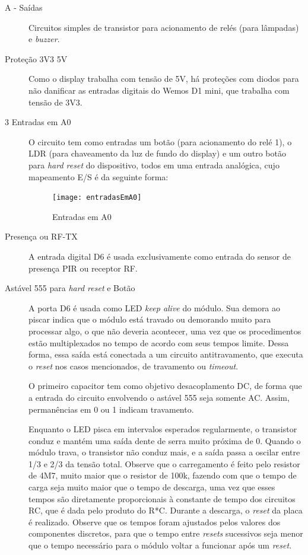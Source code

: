\begin{description}
\item [A - Saídas] Circuitos simples de transistor para acionamento de relés (para lâmpadas) e \emph{buzzer}.
\item [Proteção 3V3 5V] Como o display trabalha com tensão de 5V, há proteções com diodos para não danificar as entradas digitais do Wemos D1 mini, que trabalha com tensão de 3V3.
\item [3 Entradas em A0] O circuito tem como entradas um botão (para acionamento do relé 1), o LDR (para chaveamento da luz de fundo do display) e um outro botão para \emph{hard reset} do dispositivo, todos em uma entrada analógica, cujo mapeamento E/S é da seguinte forma:

\begin{figure}[H]
	\centering
	\caption{Entradas em A0}
  \texttt{[image: entradasEmA0]}
\label{fig:entradasEmA0}
\end{figure}

\item [Presença ou RF-TX] A entrada digital D6 é usada exclusivamente como entrada do sensor de presença PIR ou receptor RF.
\item [Astável 555 para \emph{hard reset} e Botão] A porta D6 é usada como LED \textit{keep alive} do módulo. Sua demora ao piscar indica que o módulo está travado ou demorando muito para processar algo, o que não deveria acontecer, uma vez que os procedimentos estão multiplexados no tempo de acordo com seus tempos limite. Dessa forma, essa saída está conectada a um circuito antitravamento, que executa o \emph{reset} nos casos mencionados, de travamento ou \textit{timeout}.

O primeiro capacitor tem como objetivo desacoplamento DC, de forma que a entrada do circuito envolvendo o astável 555 seja somente AC. Assim, permanências em 0 ou 1 indicam travamento.

Enquanto o LED pisca em intervalos esperados regularmente, o transistor conduz e mantém uma saída dente de serra muito próxima de 0. Quando o módulo trava, o transistor não conduz mais, e a saída passa a oscilar entre 1/3 e 2/3 da tensão total. Observe que o carregamento é feito pelo resistor de 4M7, muito maior que o resistor de 100k, fazendo com que o tempo de carga seja muito maior que o tempo de descarga, uma vez que esses tempos são diretamente proporcionais à constante de tempo dos circuitos RC, que é dada pelo produto do R*C. Durante a descarga, o \emph{reset} da placa é realizado. Observe que os tempos foram ajustados pelos valores dos componentes discretos, para que o tempo entre \emph{resets} sucessivos seja menor que o tempo necessário para o módulo voltar a funcionar após um \emph{reset}.


\end{description}
